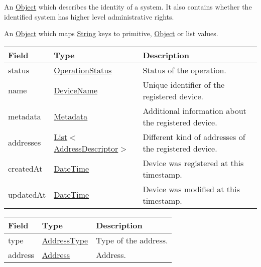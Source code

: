 \documentclass[a4paper]{arrowhead}
\newcommand{\pref}[1]{{\textcolor{ArrowheadGrey}{\hyperref[sec:model:primitives:#1]{#1}}}}
\begin{document}

An \pref{Object} which describes the identity of a system. It also contains whether the identified system has higher level administrative rights.


An \pref{Object} which maps \pref{String} keys to primitive, \pref{Object} or list values.

 
\begin{table}[ht!]
\begin{tabularx}{\textwidth}{| p{4.25cm} | p{4cm} | X |} \hline
\rowcolor{gray!33} Field & Type      & Description \\ \hline
status & \pref{OperationStatus} & Status of the operation. \\ \hline
name & \pref{DeviceName} & Unique identifier of the registered device. \\ \hline
metadata & \hyperref[sec:model:Metadata]{Metadata} & Additional information about the registered device. \\ \hline
addresses &  \pref{List}$<$\hyperref[sec:model:AddressDescriptor]{AddressDescriptor}$>$ & Different kind of addresses of the registered device.  \\ \hline
createdAt & \pref{DateTime} & Device was registered at this timestamp. \\ \hline
updatedAt & \pref{DateTime} & Device was modified at this timestamp. \\ \hline
\end{tabularx}
\end{table}

\clearpage


\begin{table}[ht!]
\begin{tabularx}{\textwidth}{| p{4.25cm} | p{3.5cm} | X |} \hline
\rowcolor{gray!33} Field & Type      & Description \\ \hline
type & \pref{AddressType} & Type of the address. \\ \hline
address & \pref{Address} & Address. \\ \hline
\end{tabularx}
\end{table}

\end{document}
